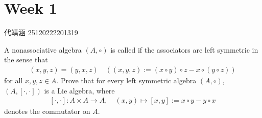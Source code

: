 \documentclass[../main.tex]{subfiles}
\begin{document}
\chapter{ Week 1 }

代靖涵 25120222201319

\begin{exercise}{}{}
A nonassociative algebra $(A, \circ)$ is called  if the associators are left symmetric in the sense that
\[\begin{aligned}
(x,y,z) = (y,x,z) \quad ((x,y,z) := (x \circ y) \circ z - x \circ (y \circ z))
\end{aligned}\]
for all $x,y,z \in A$. Prove that for every left symmetric algebra $(A, \circ)$, $(A, [\cdot, \cdot])$ is a Lie algebra, where
\[\begin{aligned}
[\cdot, \cdot] : A \times A \to A, \quad (x,y) \mapsto [x,y] := x \circ y - y \circ x
\end{aligned}\]
denotes the commutator on $A$.
\end{exercise}
\end{document}

